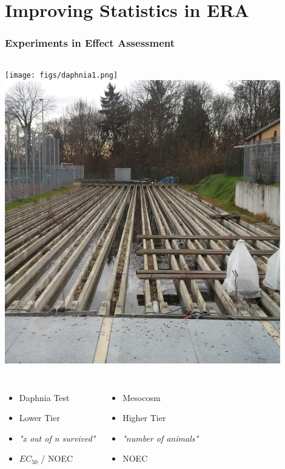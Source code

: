 \documentclass[
	10pt
	]{beamer}
\begin{document}
\section{Improving Statistics in ERA}

{%
\begin{frame}
\frametitle{Experiments in Effect Assessment}
	\begin{columns}[T]
		\texttt{[image: figs/daphnia1.png]}
	\column<2->{.49\textwidth}
		\includegraphics[width=0.9\textwidth]{figs/mesocosm_ld.jpg}
	\end{columns}

	\vfill
	\begin{columns}[T]
		\begin{itemize}
			\item Daphnia Test
			\item Lower Tier 
			\item \emph{"x out of n survived"}
			\item $EC_{50}$ / NOEC
		\end{itemize}

		\begin{itemize}
			\item Mesocosm
			\item Higher Tier 
			\item \emph{"number of animals"}
			\item NOEC
		\end{itemize}
	\end{columns}
\end{frame}
}%
\end{document}

